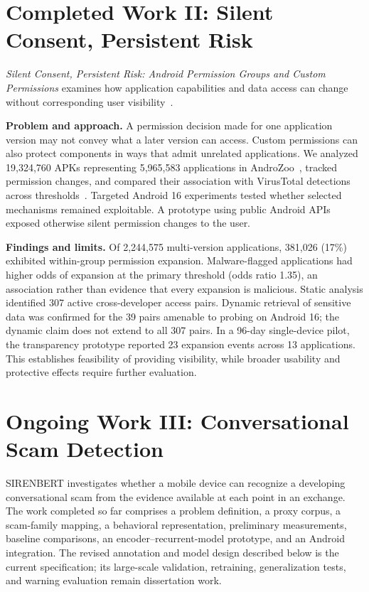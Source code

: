 \documentclass[letterpaper,11pt]{article}
\begin{document}
\section{Completed Work II: Silent Consent, Persistent Risk}
\label{sec:silentconsent}
\emph{Silent Consent, Persistent Risk: Android Permission Groups and Custom
Permissions} examines how application capabilities and data access can change
without corresponding user visibility~\cite{akanji2026silent}.

\textbf{Problem and approach.} A permission decision made for one application
version may not convey what a later version can access. Custom permissions can
also protect components in ways that admit unrelated applications. We analyzed
19,324,760 APKs representing 5,965,583 applications in
AndroZoo~\cite{allix2016androzoo}, tracked permission changes, and compared their
association with VirusTotal detections across thresholds~\cite{zhu2020vt}.
Targeted Android 16 experiments tested whether selected mechanisms remained
exploitable. A prototype using public Android APIs exposed otherwise silent
permission changes to the user.

\textbf{Findings and limits.} Of 2,244,575 multi-version applications, 381,026
(17\%) exhibited within-group permission expansion. Malware-flagged applications
had higher odds of expansion at the primary threshold (odds ratio 1.35), an
association rather than evidence that every expansion is malicious. Static
analysis identified 307 active cross-developer access pairs. Dynamic retrieval
of sensitive data was confirmed for the 39 pairs amenable to probing on
Android 16; the dynamic claim does not extend to all 307 pairs. In a 96-day
single-device pilot, the transparency prototype reported 23 expansion events
across 13 applications. This establishes feasibility of providing visibility,
while broader usability and protective effects require further evaluation.

\section{Ongoing Work III: Conversational Scam Detection}
\label{sec:sirenbert}
SIRENBERT investigates whether a mobile device can recognize a developing
conversational scam from the evidence available at each point in an exchange.
The work completed so far comprises a problem definition, a proxy corpus, a
scam-family mapping, a behavioral representation, preliminary measurements,
baseline comparisons, an encoder--recurrent-model prototype, and an Android
integration. The revised annotation and model design described below is the
current specification; its large-scale validation, retraining, generalization
tests, and warning evaluation remain dissertation work.
\end{document}

